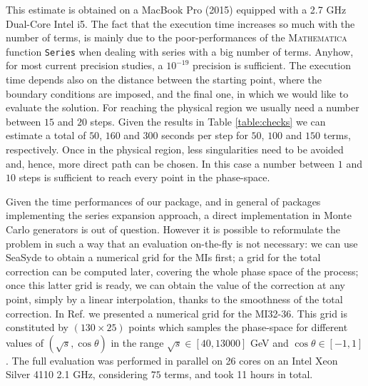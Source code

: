 This estimate is obtained on a MacBook Pro (2015) equipped with a 2.7 GHz Dual-Core Intel i5. The fact that the execution time increases so much with the number of terms, is mainly due to the poor-performances of the \textsc{Mathematica} function \texttt{Series} when dealing with series with a big number of terms. Anyhow, for most current precision studies, a $10^{-19}$ precision is sufficient. The execution time depends also on the distance between the starting point, where the boundary conditions are imposed, and the final one, in which we would like to evaluate the solution. For reaching the physical region we usually need a number between $15$ and $20$ steps. Given the results in Table \ref{table:checks} we can estimate a total of $50$, $160$ and $300$ seconds per step for $50$, $100$ and $150$ terms, respectively.
Once in the physical region, less singularities need to be avoided and, hence, more direct path can be chosen. In this case a number between $1$ and $10$ steps is sufficient to reach every point in the phase-space.

Given the time performances of our package, and in general of packages implementing the series expansion approach, a direct implementation in Monte Carlo generators is out of question.
However it is possible to reformulate the problem in such a way that an evaluation on-the-fly is not necessary: we can use {\sc SeaSyde} to obtain a numerical grid for the MIs first; a grid for the total correction can be computed later, covering the whole phase space of the process;
once this latter grid is ready, we can obtain the value of the correction at any point, simply by a linear interpolation, thanks to the smoothness of the total correction.
In Ref. \cite{Armadillo:2022bgm} we presented a numerical grid for the MI32-36. This grid is constituted by $(130\times25)$ points which samples the phase-space for different values of $(\sqrt{s},\cos\theta)$ in the range $\sqrt{s}\in [40,13000 ] $ GeV and $\cos\theta\in[-1,1]$. The full evaluation was performed in parallel on 26 cores on an Intel Xeon Silver 4110 2.1 GHz, considering $75$ terms, and took 11 hours in total. 